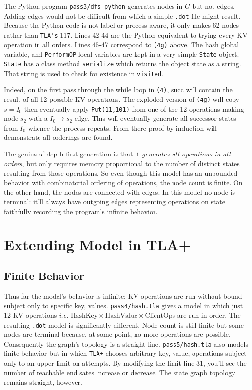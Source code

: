\documentclass[twocolumn]{article}
\begin{document}
The Python program \texttt{pass3/dfs-python} generates nodes in $G$ but not edges. Adding edges would not be difficult from which a simple \texttt{.dot} file might result. Because the Python code is not label or process aware, it only makes 62 nodes rather than \texttt{TLA's} 117. Lines 42-44 are the Python equivalent to trying every KV operation in all orders. Lines 45-47 correspond to \texttt{(4g)} above. The hash global variable, and \texttt{PerformOP} local variables are kept in a very simple \texttt{State} object. \texttt{State} has a class method \texttt{serialize} which returns the object state as a string. That string is used to check for existence in \texttt{visited}.

Indeed, on the first pass through the while loop in \texttt{(4)}, succ will contain the result of all 12 possible KV operations. The exploded version of \texttt{(4g)} will copy $s=I_0$ then eventually apply \texttt{Put(11,101)} from one of the 12 operations making node $s_2$ with a $I_0 \rightarrow s_2$ edge. This will eventually generate all successor states from $I_0$ whence the process repeats. From there proof by induction will demonstrate all orderings are found.
 
The genius of depth first generation is that it \emph{generates all operations in all orders}, but only requires memory proportional to the number of distinct states resulting from those operations. So even though this model has an unbounded behavior with combinatorial ordering of operations, the node count is finite. On the other hand, the nodes are connected with edges. In this model no node is terminal: it'll always have outgoing edges representing operations on state faithfully recording the program's infinite behavior.

\section{Extending Model in TLA+}

\subsection{Finite Behavior}

Thus far the model's behavior is infinite: KV operations are run without bound subject only to specific key, values. \texttt{pass4/hash.tla} gives a model in which just 12 KV operations \emph{i.e.} $\text{HashKey} \times \text{HashValue} \times \text{ClientOps}$ are run in order. The resulting \texttt{.dot} model is significantly different. Node count is still finite but some nodes are terminal because, at some point, no more operations are possible. Consequently the graph's topology is a straight line. \texttt{pass5/hash.tla} also models finite behavior but in which \texttt{TLA+} chooses arbitrary key, value, operations subject only to an upper limit on attempts. By modifying the limit line 31, you'll see the number of reachable end sates increase or decrease. The state graph topology remains straight, however.
\end{document}
